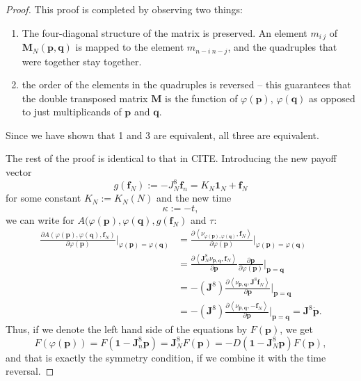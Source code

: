 \documentclass{article}
\def\p{\mathbf{p}}
\def\Mb{\mathbf{M}}
\def\q{\mathbf{q}}
\theoremstyle{definition}
\numberwithin{equation}{section}
\begin{document}
\begin{proof}
This proof is completed by observing two things:
\begin{enumerate}
    \item The four-diagonal structure of the matrix is preserved. An element $m_{i\ j}$ of $\Mb_N(\p,\q)$ is mapped to the element $m_{n-i \ n-j}$, and the quadruples that were together stay together. 
    \item the order of the elements in the quadruples is reversed -- this guarantees that the double transposed matrix $\Mb$ is the function of $\varphi(\p)$, $\varphi(\q)$ as opposed to just multiplicands of $\p$ and $\q$. 
\end{enumerate}
Since we have shown that 1 and 3 are equivalent, all three are equivalent. 

The rest of the proof is identical to that in CITE. Introducing the new payoff vector
\[
g(\mathbf{f}_N):= -J_N^8\mathbf{f}_n =K_N\mathbf{1}_N + \mathbf{f}_N 
\]
for some constant $K_N:=K_N(N)$ and the new time
\[
\kappa:=-t, 
\]
we can write for $A(\varphi(\p),\varphi(\q),g(\mathbf{f}_N)$ and $\tau$:
\begin{equation}
    \label{eq: reversed everything}
    \begin{split}
    \frac{\partial A(\varphi(\p),\varphi(\q), \mathbf{f}_N) }{\partial\varphi(\p)}\Big|_{\varphi(\p) =\varphi(\q)} &= \frac{\partial \left<\nu_{\varphi(\p), \varphi(\q)},\mathbf{f}_N\right>}{\partial\varphi(\p)}\Big|_{\varphi(\p) =\varphi(\q)} \\&=\frac{\partial\left<\mathbf{J}_N^8\nu_{\p,\q},\mathbf{f}_N\right>}{\partial\mathbf{p}}\frac{\partial\mathbf{p}}{\partial{\varphi(\p)}}\Big|_{\p=\q} \\&= -(\mathbf{J}^8)\frac{\partial\left<\nu_{\p,\q},\mathbf{J}^8\mathbf{f}_N\right>}{\partial\mathbf{p}}\Big|_{\p=\q} \\&=-(\mathbf{J}^8)\frac{\partial\left<\nu_{\p,\q},-\mathbf{f}_N\right>}{\partial\mathbf{p}}\Big|_{\p=\q} =  \mathbf{J}^8\dot{\mathbf{p}}.
\end{split}
\end{equation}
Thus, if we denote the left hand side of the equations by $F(\p)$, we get 
\begin{equation}
F(\varphi(\p)) = F(\mathbf{1} - \mathbf{J}_n^8\p) = \mathbf{J}_N^8F(\p) =  - D(\mathbf{1} -\mathbf{J}_N^8\p)F(\p),
\end{equation}
and that is exactly the symmetry condition, if we combine it with the time reversal.
\end{proof}
\end{document}
